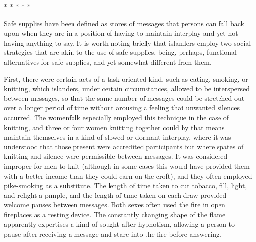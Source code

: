 \documentclass[twoside,symmetric,nobib,justified]{tufte-book}
\begin{document}
\enlargethispage{\baselineskip}

\vspace{.2in}
\begin{centering}

\Large{* * * * *}

\end{centering}
\vspace{.17in}

\noindent Safe supplies have been defined as stores of messages that persons can
fall back upon when they are in a position of having to maintain
interplay and yet not having anything to say. It is worth noting briefly
that islanders employ two social strategies that are akin to the use of
safe supplies, being, perhaps, functional alternatives for safe
supplies, and yet somewhat different from them.

First, there were certain acts of a task-oriented kind, such as eating,
smoking, or knitting, which islanders, under certain circumstances,
allowed to be interspersed between messages, so that the same number of
messages could be stretched out over a longer period of time without
arousing a feeling that unwanted silences occurred. The womenfolk
especially employed this technique in the case of knitting, and three or
four women knitting together could by that means maintain themselves in
a kind of slowed or dormant interplay, where it was understood that
those present were accredited participants but where spates of knitting
and silence were permissible between messages. It was considered
improper for men to knit (although in some cases this would have
provided them with a better income than they could earn on the croft),
and they often employed pike-smoking as a substitute. The length of time
taken to cut tobacco, fill, light, and relight a pimple, and the length
of time taken on each draw provided welcome pauses between messages.
Both sexes often used the fire in open fireplaces as a resting device.
The constantly changing shape of the flame apparently expertises a kind
of sought-after hypnotism, allowing a person to pause after receiving a
message and stare into the fire before answering.
\end{document}

